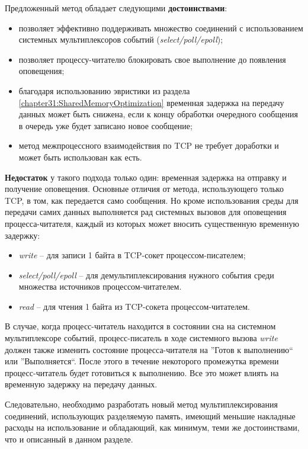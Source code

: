 Предложенный метод обладает следующими \textbf{достоинствами}:
\begin{itemize}
\item позволяет эффективно поддерживать множество соединений с использованием системных мультиплексоров событий (\textit{select/poll/epoll});
\item позволяет процессу-читателю блокировать свое выполнение до появления оповещения;
\item благодаря использованию эвристики из раздела \ref{chapter31:SharedMemoryOptimization} временная задержка на передачу данных может быть снижена, если к концу обработки очередного сообщения в очередь уже будет записано новое сообщение;
\item метод межпроцессного взаимодействия по TCP не требует доработки и может быть использован как есть.
\end{itemize}

\textbf{Недостаток} у такого подхода только один: временная задержка на отправку и получение оповещения. Основные отличия от метода, использующего только TCP, в том, как передается само сообщения. Но кроме использования среды для передачи самих данных выполняется рад системных вызовов для оповещения процесса-читателя, каждый из которых может вносить существенную временную задержку:
\begin{itemize}
\item \textit{write} -- для записи 1 байта в TCP-сокет процессом-писателем;
\item \textit{select/poll/epoll} -- для демультиплексирования нужного события среди множества источников процессом-читателем.
\item \textit{read} -- для чтения 1 байта из TCP-сокета процессом-читателем.
\end{itemize}

В случае, когда процесс-читатель находится в состоянии сна на системном мультиплексоре событий, процесс-писатель в ходе системного вызова \textit{write} должен также изменить состояние процесса-читателя на ''Готов к выполнению`` или ''Выполняется``. После этого в течение некоторого промежутка времени процесс-читатель будет готовиться к выполнению. Все это может влиять на временную задержку на передачу данных.

Следовательно, необходимо разработать новый метод мультиплексирования соединений, использующих разделяемую память, имеющий меньшие накладные расходы на использование и обладающий, как минимум, теми же достоинствами, что и описанный в данном разделе. 

